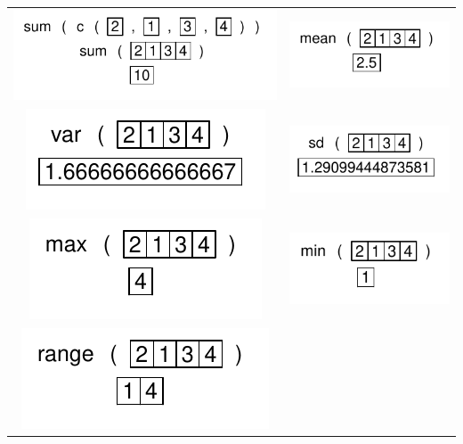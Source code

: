\documentclass[pdflatex]{article}
\begin{document}
\begin{tabular}{cc}
\includegraphics{sum} & \includegraphics{mean}\\
\includegraphics{var} & \includegraphics{sd}\\
\includegraphics{max} & \includegraphics{min}\\
\includegraphics{range} & \\

\end{tabular}
\end{document}
